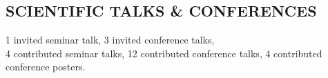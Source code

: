 \documentclass[letter, margin, 10pt]{res} %
\begin{document}
\begin{resume}

\parskip \baselineskip
\vspace{-6pt}
\section{SCIENTIFIC TALKS \& CONFERENCES}
1 invited seminar talk, 3 invited conference talks,\\
4 contributed seminar talks, 12 contributed conference talks, 4 contributed conference posters.


\end{resume}
\end{document}
